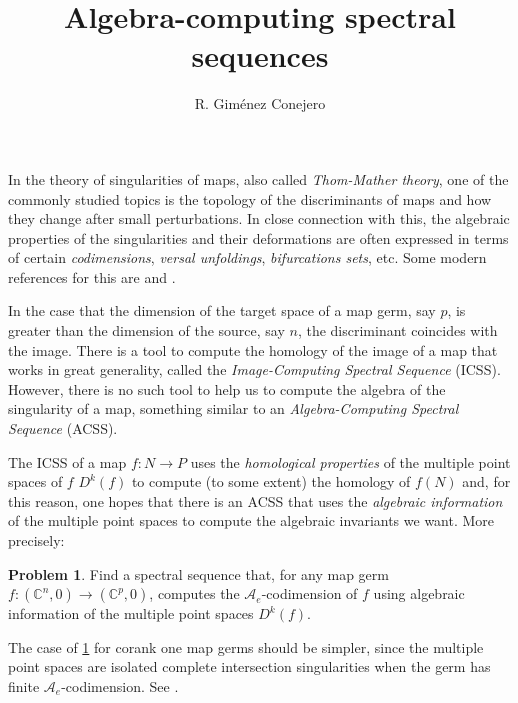 \documentclass[a4paper,11pt]{amsart}
\theoremstyle{plain}
\theoremstyle{definition}
\newtheorem{problem}[theorem]{Problem}
\begin{document}
\author{R. Giménez Conejero}
\title{Algebra-computing spectral sequences}


\maketitle


In the theory of singularities of maps, also called \textsl{Thom-Mather theory}, one of the commonly studied topics is the topology of the discriminants of maps and how they change after small perturbations. In close connection with this, the algebraic properties of the singularities and their deformations are often expressed in terms of certain \textsl{codimensions}, \textsl{versal unfoldings}, \textsl{bifurcations sets}, etc. Some modern references for this are \cite{Mond2020} and \cite[Chapter 2]{HB3}.

In the case that the dimension of the target space of a map germ, say $p$, is greater than the dimension of the source, say $n$, the discriminant coincides with the image. There is a tool to compute the homology of the image of a map that works in great generality, called the \textit{Image-Computing Spectral Sequence} (ICSS). However, there is no such tool to help us to compute the algebra of the singularity of a map, something similar to an \textsl{Algebra-Computing Spectral Sequence} (ACSS).

The ICSS of a map $f:N\rightarrow P$ uses the \textsl{homological properties} of the multiple point spaces of $f$ $D^k(f)$ to compute (to some extent) the homology of $f(N)$ and, for this reason, one hopes that there is an ACSS that uses the \textsl{algebraic information} of the multiple point spaces to compute the algebraic invariants we want. More precisely:

\begin{problem}\label{prob:ACSS}
Find a spectral sequence that, for any map germ $f:(\mathbb{C}^n,0)\rightarrow(\mathbb{C}^p,0)$, computes the $\mathscr{A}_e$-codimension of $f$ using algebraic information of the multiple point spaces $D^k(f)$.
\end{problem}

The case of \cref{prob:ACSS} for corank one map germs should be simpler, since the multiple point spaces are isolated complete intersection singularities when the germ has finite $\mathscr{A}_e$-codimension. See \cite[Proposition 2.14]{Marar1989}.
\end{document}
